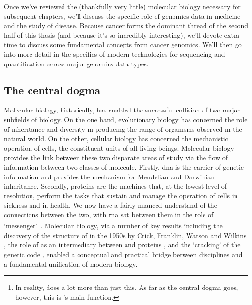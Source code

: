 \documentclass[thesis.tex]{subfiles}
\begin{document}
Once we've reviewed the (thankfully very little) molecular biology necessary for subsequent chapters, we'll discuss the specific role of genomics data in medicine and the study of disease. Because cancer forms the dominant thread of the second half of this thesis (and because it's so incredibly interesting), we'll devote extra time to discuss some fundamental concepts from cancer genomics. We'll then go into more detail in the specifics of modern technologies for sequencing and quantification across major genomics data types.

\subsection{The central dogma \label{sec:central_dogma}}
Molecular biology, historically, has enabled the successful collision of two major subfields of biology. On the one hand, evolutionary biology has concerned the role of inheritance and diversity in producing the range of organisms observed in the natural world. On the other, cellular biology has concerned the mechanistic operation of cells, the constituent units of all living beings. Molecular biology provides the link between these two disparate areas of study via the flow of information between two classes of molecule. Firstly, \gls{dna} is the carrier of genetic information and provides the mechanism for Mendelian and Darwinian inheritance. Secondly, proteins are the machines that, at the lowest level of resolution, perform the tasks that sustain and manage the operation of cells in sickness and in health. We now have a fairly nuanced understand of the connections between the two, with \gls{rna} sat between them in the role of `messenger'\footnote{In reality,  does a lot more than just this. As far as the central dogma goes, however, this is 's main function.}. Molecular biology, via a number of key results including the discovery of the structure of  in the 1950s by Crick, Franklin, Watson and Wilkins \citep{franklin_molecular_1953, watson_molecular_1953, wilkins_molecular_1953, maddox_double_2003}, the role of  as an intermediary between  and proteins \citep{boivin_sur_1947, crick_protein_1958, brenner_unstable_1961, cobb_who_2015}, and the `cracking' of the genetic code \citep{crick_general_1961, nirenberg_rna_1964, brenner_uga_1967, tamura_genetic_2016}, enabled a conceptual and practical bridge
between disciplines and a fundamental unification of modern biology. 
\end{document}
